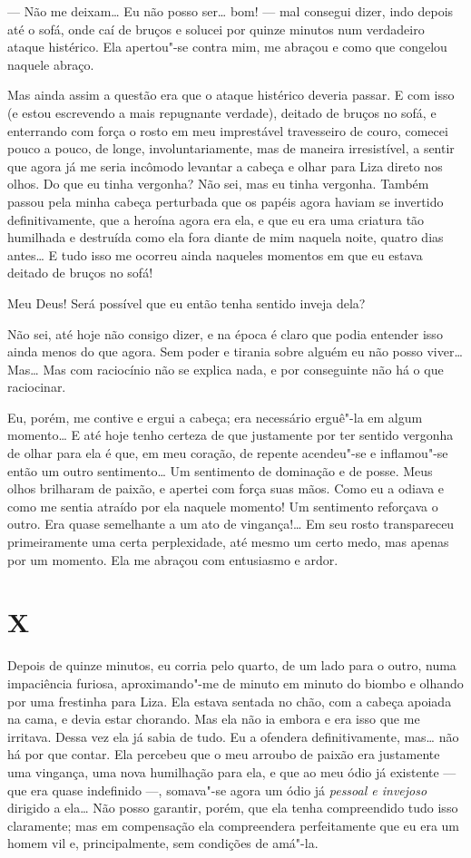 --- Não me deixam\ldots{} Eu não posso ser\ldots{} bom! --- mal consegui dizer, indo
depois até o sofá, onde caí de bruços e solucei por quinze minutos num
verdadeiro ataque histérico. Ela apertou"-se contra mim, me abraçou e
como que congelou naquele abraço.

Mas ainda assim a questão era que o ataque histérico deveria passar. E
com isso (e estou escrevendo a mais repugnante verdade), deitado de
bruços no sofá, e enterrando com força o rosto em meu imprestável
travesseiro de couro, comecei pouco a pouco, de longe,
involuntariamente, mas de maneira irresistível, a sentir que agora já
me seria incômodo levantar a cabeça e olhar para Liza direto nos olhos.
Do que eu tinha vergonha? Não sei, mas eu tinha vergonha. Também passou
pela minha cabeça perturbada que os papéis agora haviam se invertido
definitivamente, que a heroína agora era ela, e que eu era uma criatura
tão humilhada e destruída como ela fora diante de mim naquela noite,
quatro dias antes\ldots{} E tudo isso me ocorreu ainda naqueles momentos em
que eu estava deitado de bruços no sofá!

Meu Deus! Será possível que eu então tenha sentido inveja dela?

Não sei, até hoje não consigo dizer, e na época é claro que podia
entender isso ainda menos do que agora. Sem poder e tirania sobre
alguém eu não posso viver\ldots{} Mas\ldots{} Mas com raciocínio não se explica
nada, e por conseguinte não há o que raciocinar.

Eu, porém, me contive e ergui a cabeça; era necessário erguê"-la em algum
momento\ldots{} E até hoje tenho certeza de que justamente por ter sentido
vergonha de olhar para ela é que, em meu coração, de repente acendeu"-se
e inflamou"-se então um outro sentimento\ldots{} Um sentimento de dominação e
de posse. Meus olhos brilharam de paixão, e apertei com força suas
mãos. Como eu a odiava e como me sentia atraído por ela naquele
momento! Um sentimento reforçava o outro. Era quase semelhante a um ato
de vingança!\ldots{} Em seu rosto transpareceu primeiramente uma certa
perplexidade, até mesmo um certo medo, mas apenas por um momento. Ela
me abraçou com entusiasmo e ardor.


\section{X}

Depois de quinze minutos, eu corria pelo quarto, de um lado para o outro, numa
impaciência furiosa, aproximando"-me de minuto em minuto do biombo e olhando por
uma frestinha para Liza. Ela estava sentada no chão, com a cabeça apoiada na
cama, e devia estar chorando. Mas ela não ia embora e era isso que me irritava.
Dessa vez ela já sabia de tudo.  Eu a ofendera definitivamente, mas\ldots{} não
há por que contar. Ela percebeu que o meu arroubo de paixão era justamente uma
vingança, uma nova humilhação para ela, e que ao meu ódio já existente --- que
era quase indefinido ---, somava"-se agora um ódio já \textit{pessoal e
invejoso} dirigido a ela\ldots{} Não posso garantir, porém, que ela tenha
compreendido tudo isso claramente; mas em compensação ela compreendera
perfeitamente que eu era um homem vil e, principalmente, sem condições de
amá"-la.

